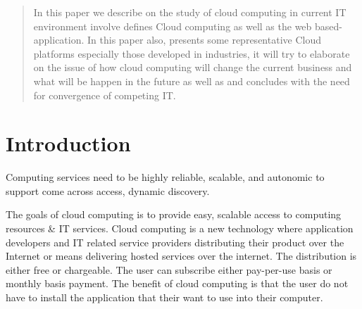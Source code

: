 \documentclass[conference, compsoc]{IEEEtran}
\begin{document}
\begin{abstract}
In this paper we describe on the study of cloud computing in current IT environment involve defines Cloud computing as well as the web based-application. In this paper also, presents some representative Cloud platforms especially those developed in industries, it will try to elaborate on the issue of how cloud computing will change the current business and what will be happen in the future as well as and concludes with the need for convergence of competing IT.   

\end{abstract}





%
\IEEEpeerreviewmaketitle



\section{Introduction}
Computing services need to be highly reliable, scalable, and autonomic to support come across access, dynamic discovery.

The goals of cloud computing is to provide easy, scalable access to computing resources & IT services. Cloud computing is a new technology where application developers and IT related service providers distributing their product over the Internet or means delivering hosted services over the internet. The distribution is either free or chargeable. The user can subscribe either pay-per-use basis or monthly basis payment. The benefit of cloud computing is that the user do not have to install the application that their want to use into their computer.
\end{document}
